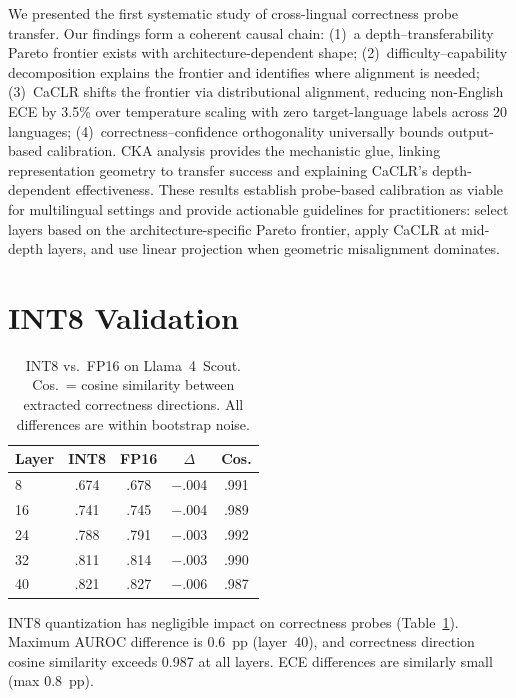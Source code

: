 \documentclass[11pt,a4paper]{article}
\begin{document}
We presented the first systematic study of cross-lingual correctness probe transfer.
Our findings form a coherent causal chain: (1)~a depth--transferability Pareto frontier exists with architecture-dependent shape; (2)~difficulty--capability decomposition explains the frontier and identifies where alignment is needed; (3)~CaCLR shifts the frontier via distributional alignment, reducing non-English ECE by 3.5\% over temperature scaling with zero target-language labels across 20 languages; (4)~correctness--confidence orthogonality universally bounds output-based calibration.
CKA analysis provides the mechanistic glue, linking representation geometry to transfer success and explaining CaCLR's depth-dependent effectiveness.
These results establish probe-based calibration as viable for multilingual settings and provide actionable guidelines for practitioners: select layers based on the architecture-specific Pareto frontier, apply CaCLR at mid-depth layers, and use linear projection when geometric misalignment dominates.


\appendix

\section{INT8 Validation}
\label{app:int8}

\begin{table}[h]
\centering
\small
\begin{tabular}{@{}lcccc@{}}
\toprule
\textbf{Layer} & \textbf{INT8} & \textbf{FP16} & $\Delta$ & \textbf{Cos.} \\
\midrule
8  & .674 & .678 & $-$.004 & .991 \\
16 & .741 & .745 & $-$.004 & .989 \\
24 & .788 & .791 & $-$.003 & .992 \\
32 & .811 & .814 & $-$.003 & .990 \\
40 & .821 & .827 & $-$.006 & .987 \\
\bottomrule
\end{tabular}
\caption{INT8 vs.\ FP16 on Llama~4~Scout. Cos.\ = cosine similarity between extracted correctness directions. All differences are within bootstrap noise.}
\label{tab:int8}
\end{table}

INT8 quantization has negligible impact on correctness probes (Table~\ref{tab:int8}).
Maximum AUROC difference is 0.6~pp (layer~40), and correctness direction cosine similarity exceeds 0.987 at all layers.
ECE differences are similarly small (max 0.8~pp).
\end{document}
